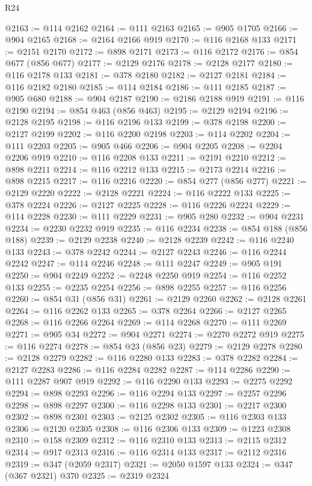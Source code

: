 \begin{lexlean}{R24}
\begin{coremodule}
@2163 := @114 @2162
@2164 := @111 @2163
@2165 := @905 @1705
@2166 := @904 @2165
@2168 := @2164 @2166 @919
@2170 := @116 @2168 @133
@2171 := @2151 @2170
@2172 := @898 @2171
@2173 := @116 @2172
@2176 := @854 @677 (@856 @677)
@2177 := @2129 @2176
@2178 := @2128 @2177
@2180 := @116 @2178 @133
@2181 := @378 @2180
@2182 := @2127 @2181
@2184 := @116 @2182 @2180
@2185 := @114 @2184
@2186 := @111 @2185
@2187 := @905 @680
@2188 := @904 @2187
@2190 := @2186 @2188 @919
@2191 := @116 @2190
@2194 := @854 @463 (@856 @463)
@2195 := @2129 @2194
@2196 := @2128 @2195
@2198 := @116 @2196 @133
@2199 := @378 @2198
@2200 := @2127 @2199
@2202 := @116 @2200 @2198
@2203 := @114 @2202
@2204 := @111 @2203
@2205 := @905 @466
@2206 := @904 @2205
@2208 := @2204 @2206 @919
@2210 := @116 @2208 @133
@2211 := @2191 @2210
@2212 := @898 @2211
@2214 := @116 @2212 @133
@2215 := @2173 @2214
@2216 := @898 @2215
@2217 := @116 @2216
@2220 := @854 @277 (@856 @277)
@2221 := @2129 @2220
@2222 := @2128 @2221
@2224 := @116 @2222 @133
@2225 := @378 @2224
@2226 := @2127 @2225
@2228 := @116 @2226 @2224
@2229 := @114 @2228
@2230 := @111 @2229
@2231 := @905 @280
@2232 := @904 @2231
@2234 := @2230 @2232 @919
@2235 := @116 @2234
@2238 := @854 @188 (@856 @188)
@2239 := @2129 @2238
@2240 := @2128 @2239
@2242 := @116 @2240 @133
@2243 := @378 @2242
@2244 := @2127 @2243
@2246 := @116 @2244 @2242
@2247 := @114 @2246
@2248 := @111 @2247
@2249 := @905 @191
@2250 := @904 @2249
@2252 := @2248 @2250 @919
@2254 := @116 @2252 @133
@2255 := @2235 @2254
@2256 := @898 @2255
@2257 := @116 @2256
@2260 := @854 @31 (@856 @31)
@2261 := @2129 @2260
@2262 := @2128 @2261
@2264 := @116 @2262 @133
@2265 := @378 @2264
@2266 := @2127 @2265
@2268 := @116 @2266 @2264
@2269 := @114 @2268
@2270 := @111 @2269
@2271 := @905 @34
@2272 := @904 @2271
@2274 := @2270 @2272 @919
@2275 := @116 @2274
@2278 := @854 @23 (@856 @23)
@2279 := @2129 @2278
@2280 := @2128 @2279
@2282 := @116 @2280 @133
@2283 := @378 @2282
@2284 := @2127 @2283
@2286 := @116 @2284 @2282
@2287 := @114 @2286
@2290 := @111 @2287 @907 @919
@2292 := @116 @2290 @133
@2293 := @2275 @2292
@2294 := @898 @2293
@2296 := @116 @2294 @133
@2297 := @2257 @2296
@2298 := @898 @2297
@2300 := @116 @2298 @133
@2301 := @2217 @2300
@2302 := @898 @2301
@2303 := @2125 @2302
@2305 := @116 @2303 @133
@2306 := @2120 @2305
@2308 := @116 @2306 @133
@2309 := @1223 @2308
@2310 := @158 @2309
@2312 := @116 @2310 @133
@2313 := @2115 @2312
@2314 := @917 @2313
@2316 := @116 @2314 @133
@2317 := @2112 @2316
@2319 := @347 (@2059 @2317)
@2321 := @2050 @1597 @133
@2324 := @347 (@367 @2321) @370
@2325 := @2319 @2324

\end{coremodule}
\end{lexlean}
